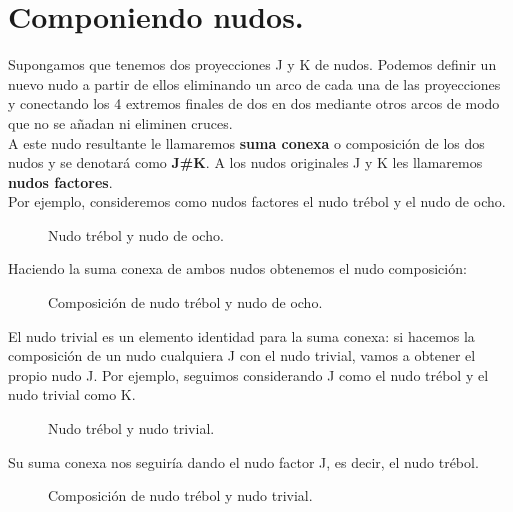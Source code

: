 \section{Componiendo nudos.}\label{seccion3}
Supongamos que tenemos dos proyecciones J y K de nudos. Podemos definir un nuevo nudo a partir de ellos eliminando un arco de cada una de las proyecciones y conectando los 4 extremos finales de dos en dos mediante otros arcos de modo que no se añadan ni eliminen cruces.\\
A este nudo resultante le llamaremos \textbf{suma conexa} o composición de los dos nudos y se denotará como \textbf{J\#K}. A los nudos originales J y K les llamaremos \textbf{nudos factores}. \\

Por ejemplo, consideremos como nudos factores el nudo trébol y el nudo de ocho. 
\begin{figure}[h!]
	\centering
	\caption{Nudo trébol y nudo de ocho.}
	\label{comp1} 
\end{figure}

Haciendo la suma conexa de ambos nudos obtenemos el nudo composición:
\begin{figure}[h!]
	\centering
	\caption{Composición de nudo trébol y nudo de ocho.}
	\label{comp2} 
\end{figure}


El nudo trivial es un elemento identidad para la suma conexa: si hacemos la composición de un nudo cualquiera J con el nudo trivial, vamos a obtener el propio nudo J. Por ejemplo, seguimos considerando J como el nudo trébol y el nudo trivial como K. \\
\begin{figure}[h!]
	\centering
	\caption{Nudo trébol y nudo trivial.}
	\label{comp3} 
\end{figure}

Su suma conexa nos seguiría dando el nudo factor J, es decir, el nudo trébol.\\

\begin{figure}[h!]
	\centering
	\caption{Composición de nudo trébol y nudo trivial.}
	\label{comp4} 
\end{figure}

